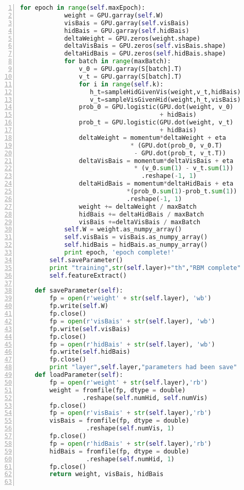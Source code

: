 \begin{lstlisting}[language=Python,numbers=left, frame=shadowbox, rulesepcolor=\color{cadegrey}, caption=\text{RBM.py}]
        for epoch in range(self.maxEpoch):
            weight = GPU.garray(self.W)
            visBais = GPU.garray(self.visBais)
            hidBais = GPU.garray(self.hidBais)
            deltaWeight = GPU.zeros(weight.shape)
            deltaVisBais = GPU.zeros(self.visBais.shape)
            deltaHidBais = GPU.zeros(self.hidBais.shape)
            for batch in range(maxBatch):
                v_0 = GPU.garray(S[batch].T)
                v_t = GPU.garray(S[batch].T)
                for i in range(self.k):
                   h_t=sampleHidGivenVis(weight,v_t,hidBais)
                   v_t=sampleVisGivenHid(weight,h_t,visBais)
                prob_0 = GPU.logistic(GPU.dot(weight, v_0) 
                                      + hidBais)
                prob_t = GPU.logistic(GPU.dot(weight, v_t) 
                                      + hidBais)
                deltaWeight = momentum*deltaWeight + eta 
                              * (GPU.dot(prob_0, v_0.T) 
                               - GPU.dot(prob_t, v_t.T))
                deltaVisBais = momentum*deltaVisBais + eta
                               * (v_0.sum(1) - v_t.sum(1))
                                 .reshape(-1, 1)
                deltaHidBais = momentum*deltaHidBais + eta
                             *(prob_0.sum(1)-prob_t.sum(1))
                             .reshape(-1, 1)
                weight += deltaWeight / maxBatch
                hidBais += deltaHidBais / maxBatch
                visBais +=deltaVisBais / maxBatch
            self.W = weight.as_numpy_array()
            self.visBais = visBais.as_numpy_array()
            self.hidBais = hidBais.as_numpy_array()
            print epoch, 'epoch complete!'    
        self.saveParameter()
        print "training",str(self.layer)+"th","RBM complete"
        self.featureExtract()
        
    def saveParameter(self):
        fp = open(r'weight' + str(self.layer), 'wb')
        fp.write(self.W)
        fp.close()
        fp = open(r'visBais' + str(self.layer), 'wb')
        fp.write(self.visBais)
        fp.close()
        fp = open(r'hidBais' + str(self.layer), 'wb')
        fp.write(self.hidBais)
        fp.close()
        print "layer",self.layer,"parameters had been save"    
    def loadParameter(self):
        fp = open(r'weight' + str(self.layer),'rb')
        weight = fromfile(fp, dtype = double)
                 .reshape(self.numHid, self.numVis)
        fp.close()
        fp = open(r'visBais' + str(self.layer),'rb')
        visBais = fromfile(fp, dtype = double)
                  .reshape(self.numVis, 1)
        fp.close()
        fp = open(r'hidBais' + str(self.layer),'rb')
        hidBais = fromfile(fp, dtype = double)
                  .reshape(self.numHid, 1)
        fp.close()
        return weight, visBais, hidBais


\end{lstlisting}
